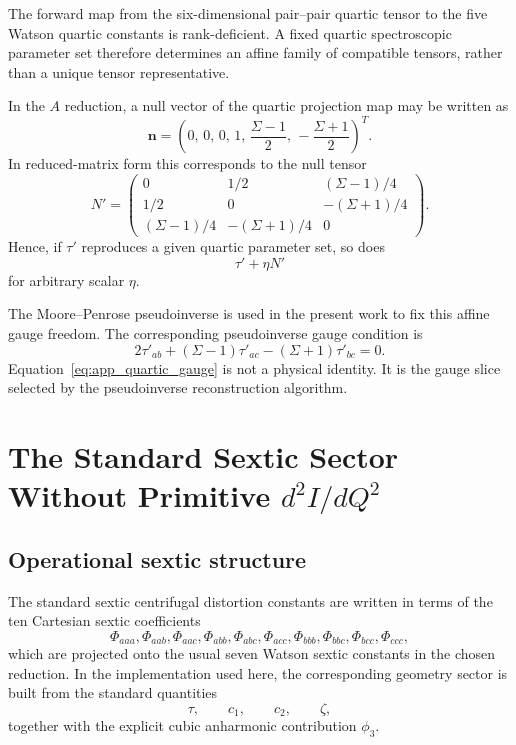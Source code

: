 The forward map from the six-dimensional pair--pair quartic tensor to the five
Watson quartic constants is rank-deficient. A fixed quartic spectroscopic
parameter set therefore determines an affine family of compatible tensors,
rather than a unique tensor representative.

In the $A$ reduction, a null vector of the quartic projection map may be
written as
\begin{equation}
\mathbf n =
\left(
0,\,
0,\,
0,\,
1,\,
\frac{\Sigma-1}{2},\,
-\frac{\Sigma+1}{2}
\right)^T.
\end{equation}
In reduced-matrix form this corresponds to the null tensor
\begin{equation}
N'=
\begin{pmatrix}
0 & 1/2 & (\Sigma-1)/4 \\
1/2 & 0 & -(\Sigma+1)/4 \\
(\Sigma-1)/4 & -(\Sigma+1)/4 & 0
\end{pmatrix}.
\end{equation}
Hence, if $\tau'$ reproduces a given quartic parameter set, so does
\begin{equation}
\tau' + \eta N'
\end{equation}
for arbitrary scalar $\eta$.

The Moore--Penrose pseudoinverse is used in the present work to fix this affine
gauge freedom. The corresponding pseudoinverse gauge condition is
\begin{equation}
2\tau'_{ab}+(\Sigma-1)\tau'_{ac}-(\Sigma+1)\tau'_{bc}=0.
\label{eq:app_quartic_gauge}
\end{equation}
Equation~\eqref{eq:app_quartic_gauge} is not a physical identity. It is the
gauge slice selected by the pseudoinverse reconstruction algorithm.

\section{The Standard Sextic Sector Without Primitive \texorpdfstring{$d^2I/dQ^2$}{d2I/dQ2}}

\subsection{Operational sextic structure}

The standard sextic centrifugal distortion constants are written in terms of
the ten Cartesian sextic coefficients
\begin{equation}
\Phi_{aaa},\Phi_{aab},\Phi_{aac},\Phi_{abb},\Phi_{abc},
\Phi_{acc},\Phi_{bbb},\Phi_{bbc},\Phi_{bcc},\Phi_{ccc},
\end{equation}
which are projected onto the usual seven Watson sextic constants in the chosen
reduction. In the implementation used here, the corresponding geometry sector
is built from the standard quantities
\begin{equation}
\tau,\qquad c_1,\qquad c_2,\qquad \zeta,
\end{equation}
together with the explicit cubic anharmonic contribution $\phi_3$.

